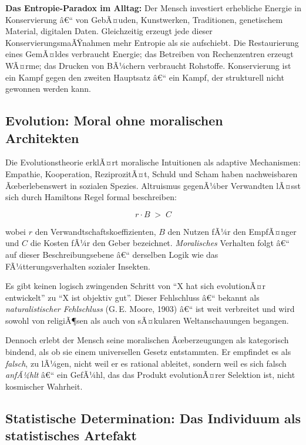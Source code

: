 ﻿\documentclass[12pt, a4paper]{article}
\begin{document}
\begin{infobox}
\textbf{Das Entropie-Paradox im Alltag:} Der Mensch investiert erhebliche
Energie in Konservierung â€“ von GebÃ¤uden, Kunstwerken, Traditionen, genetischem
Material, digitalen Daten. Gleichzeitig erzeugt jede dieser KonservierungsmaÃŸnahmen
mehr Entropie als sie aufschiebt. Die Restaurierung eines GemÃ¤ldes verbraucht
Energie; das Betreiben von Rechenzentren erzeugt WÃ¤rme; das Drucken von BÃ¼chern
verbraucht Rohstoffe. Konservierung ist ein Kampf gegen den zweiten Hauptsatz â€“
ein Kampf, der strukturell nicht gewonnen werden kann.
\end{infobox}

\subsection{Evolution: Moral ohne moralischen Architekten}

Die Evolutionstheorie erklÃ¤rt moralische Intuitionen als adaptive Mechanismen:
Empathie, Kooperation, ReziprozitÃ¤t, Schuld und Scham haben nachweisbaren
Ãœberlebenswert in sozialen Spezies. Altruismus gegenÃ¼ber Verwandten lÃ¤sst sich
durch Hamiltons Regel formal beschreiben:

\begin{equation}
  r \cdot B \;>\; C
\end{equation}

wobei $r$ den Verwandtschaftskoeffizienten, $B$ den Nutzen fÃ¼r den EmpfÃ¤nger
und $C$ die Kosten fÃ¼r den Geber bezeichnet. \emph{Moralisches} Verhalten
folgt â€“ auf dieser Beschreibungsebene â€“ derselben Logik wie das FÃ¼tterungsverhalten
sozialer Insekten.

Es gibt keinen logisch zwingenden Schritt von \enquote{X hat sich evolutionÃ¤r
entwickelt} zu \enquote{X ist objektiv gut}. Dieser Fehlschluss â€“ bekannt als
\emph{naturalistischer Fehlschluss} (G.\,E. Moore, 1903) â€“ ist weit verbreitet
und wird sowohl von religiÃ¶sen als auch von sÃ¤kularen Weltanschauungen begangen.

Dennoch erlebt der Mensch seine moralischen Ãœberzeugungen als kategorisch bindend,
als ob sie einem universellen Gesetz entstammten. Er empfindet es als \emph{falsch},
zu lÃ¼gen, nicht weil er es rational ableitet, sondern weil es sich falsch
\emph{anfÃ¼hlt} â€“ ein GefÃ¼hl, das das Produkt evolutionÃ¤rer Selektion ist,
nicht kosmischer Wahrheit.

\subsection{Statistische Determination: Das Individuum als statistisches Artefakt}
\end{document}
